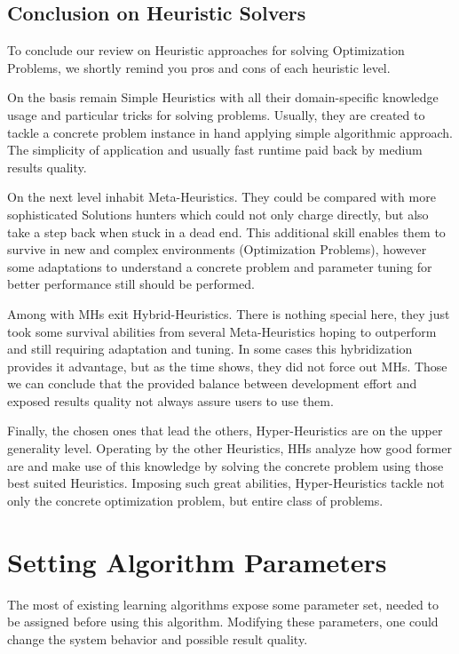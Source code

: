 \subsection{Conclusion on Heuristic Solvers}
To conclude our review on Heuristic approaches for solving Optimization Problems, we shortly remind you pros and cons of each heuristic level.

On the basis remain Simple Heuristics with all their domain-specific knowledge usage and particular tricks for solving problems. Usually, they are created to tackle a concrete problem instance in hand applying simple algorithmic approach. The simplicity of application and usually fast runtime paid back by medium results quality.

On the next level inhabit Meta-Heuristics. They could be compared with more sophisticated Solutions hunters which could not only charge directly, but also take a step back when stuck in a dead end. This additional skill enables them to survive in new and complex environments (Optimization Problems), however some adaptations to understand a concrete problem and parameter tuning for better performance still should be performed.

Among with MHs exit Hybrid-Heuristics. There is nothing special here, they just took some survival abilities from several Meta-Heuristics hoping to outperform and still requiring adaptation and tuning. In some cases this hybridization provides it advantage, but as the time shows, they did not force out MHs. Those we can conclude that the provided balance between development effort and exposed results quality not always assure users to use them.

Finally, the chosen ones that lead the others, Hyper-Heuristics are on the upper generality level. 
Operating by the other Heuristics, HHs analyze how good former are and make use of this knowledge by solving the concrete problem using those best suited Heuristics. Imposing such great abilities, Hyper-Heuristics tackle not only the concrete optimization problem, but entire class of problems.


\section{Setting Algorithm Parameters}\label{bg: section Parameters Setting}
The most of existing learning algorithms expose some parameter set, needed to be assigned before using this algorithm. Modifying these parameters, one could change the system behavior and possible result quality.

